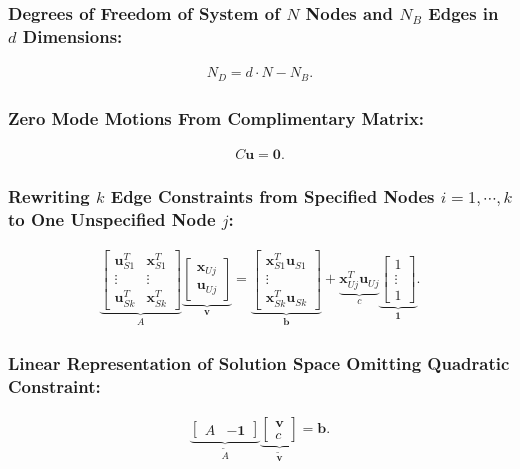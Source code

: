 \documentclass[%
preprint,
 amsmath,amssymb,
 aps,
]{revtex4-1}
\begin{document}
\subsubsection{Degrees of Freedom of System of $N$ Nodes and $N_B$ Edges in $d$ Dimensions:}
\begin{align}
\label{eq:dof}
N_D = d \cdot N - N_B.
\end{align}

\subsubsection{Zero Mode Motions From Complimentary Matrix:}
\begin{align}
\label{eq:compatibility}
C\bm{u} = \bm{0}.
\end{align}

\subsubsection{Rewriting $k$ Edge Constraints from Specified Nodes $i = 1,\dotsm,k$ to One Unspecified Node $j$:}
\begin{align}
\label{eq:constraint_nonlinear}
\underbrace{
	\begin{bmatrix}
	\bm{u}_{S1}^T & \bm{x}_{S1}^T\\
	\vdots & \vdots\\
	\bm{u}_{Sk}^T & \bm{x}_{Sk}^T
	\end{bmatrix}
}_{A}
\underbrace{
	\begin{bmatrix}
	\bm{x}_{Uj} \\ 
	\bm{u}_{Uj}
	\end{bmatrix}
}_{\bm{v}}
=
\underbrace{
	\begin{bmatrix} 
	\bm{x}_{S1}^T\bm{u}_{S1}\\ 
	\vdots\\
	\bm{x}_{Sk}^T\bm{u}_{Sk}
	\end{bmatrix}
}_{\bm{b}}
+
\underbrace{
	\bm{x}_{Uj}^T\bm{u}_{Uj}
}_{c}
\underbrace{
	\begin{bmatrix}
	1\\
	\vdots\\
	1
	\end{bmatrix}
}_{\bm{1}}.
\end{align}

\subsubsection{Linear Representation of Solution Space Omitting Quadratic Constraint:}
\begin{align}
\label{eq:linear}
\underbrace{
	\begin{bmatrix}
	A & -\bm{1}
	\end{bmatrix}
}_{\tilde{A}}
\underbrace{
	\begin{bmatrix}
	\bm{v}\\
	c
	\end{bmatrix}
}_{\tilde{\bm{v}}}
=
\bm{b}.
\end{align}
\end{document}
